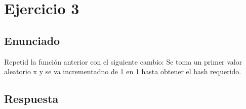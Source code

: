 \documentclass[10pt,a4paper,spanish]{report}
\begin{document}
\chapter{Ejercicio 3}

\section{Enunciado}
\noindent
Repetid la función anterior con el siguiente cambio: Se toma un primer valor aleatorio x y se va incrementadno de 1 en 1 hasta obtener el hash requerido.

\section{Respuesta}
\noindent
\end{document}
